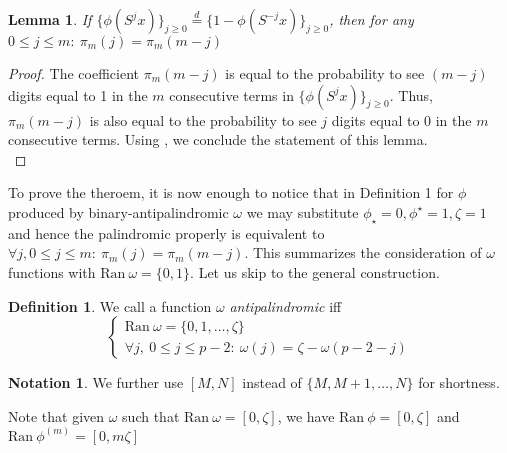 \documentclass[a4paper]{article}
\theoremstyle{plain}
\newtheorem{lemma}{Lemma}[section]
\theoremstyle{definition}
\newtheorem{definition}{Definition}
\newtheorem*{notation}{Notation}
\begin{document}
\begin{lemma}
If $\{\phi(S^j x)\}_{j \ge 0} \overset{d}{=} \{ 1 - \phi(S^{-j} x)\}_{j \ge 0}$, then for any $0 \le j \le m:\ \pi_m(j)=\pi_m(m-j)$
\end{lemma}
\begin{proof}
The coefficient $\pi_m(m-j)$ is equal to the probability to see $(m-j)$ digits equal to 1 in the $m$ consecutive terms in $\{\phi(S^j x)\}_{j \ge 0}$. Thus, $\pi_m(m-j)$ is also equal to the probability to see $j$ digits equal to $0$ in the $m$ consecutive terms. Using , we conclude the statement of this lemma.\\
\end{proof}

To prove the theroem, it is now enough to notice that in Definition 1 for $\phi$ produced by binary-antipalindromic $\omega$ we may substitute $\phi_\star = 0, \phi^\star = 1, \zeta=1$ and hence the palindromic properly is equivalent to $\forall j, 0 \le j \le m:\ \pi_m(j)=\pi_m(m-j)$.
This summarizes the consideration of $\omega$ functions with $\mathrm{Ran }\ \omega = \{0,1\} $. Let us skip to the general construction.

\begin{definition}
We call a function $\omega$  \textit{antipalindromic} iff
\[\begin{cases}
	\mathrm{Ran }\ \omega = \{0,1, \ldots, \zeta\} \\
	\forall j,\ 0 \le j \le p-2: \  \omega(j) = \zeta - \omega(p-2-j)
\end{cases}\]
\end{definition}


\begin{notation}
We further use $[M, N]$ instead of $\{M,M+1, \ldots, N\}$ for shortness.
\end{notation}
Note that given $\omega$ such that $\mathrm{Ran}\ \omega = [0,\zeta]$, we have $\mathrm{Ran}\ \phi = [0,\zeta]$ and $\mathrm{Ran}\ \phi^{(m)} = [0,m\zeta]$
\end{document}

